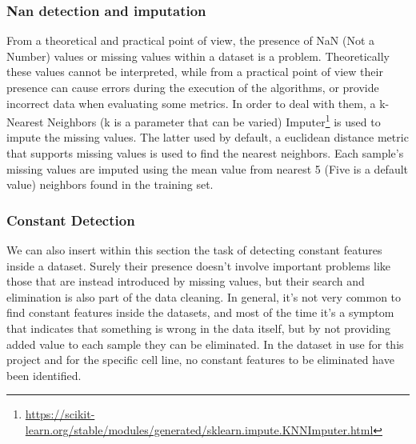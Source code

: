 \documentclass{article}
\begin{document}
\subsubsection{Nan detection and imputation}
\label{subsec:Nan_detection_and_imputation}
From a theoretical and practical point of view, the presence of NaN (Not a Number) values or missing values within a dataset is a problem. Theoretically these values cannot be interpreted, while from a practical point of view their presence can cause errors during the execution of the algorithms, or provide incorrect data when evaluating some metrics. In order to deal with them, a k-Nearest Neighbors (k is a parameter that can be varied) Imputer\footnote{\url{https://scikit-learn.org/stable/modules/generated/sklearn.impute.KNNImputer.html}} is used to impute the missing values. The latter used by default, a euclidean distance metric that supports missing values is used to find the nearest neighbors. Each sample’s missing values are imputed using the mean value from nearest 5 (Five is a default value) neighbors found in the training set.

\subsubsection{Constant Detection}
\label{subsec:Constant_Detection}
We can also insert within this section the task of detecting constant features inside a dataset. Surely their presence doesn't involve important problems like those that are instead introduced by missing values, but their search and elimination is also part of the data cleaning. In general, it's not very common to find constant features inside the datasets, and most of the time it's a symptom that indicates that something is wrong in the data itself, but by not providing added value to each sample they can be eliminated. In the dataset in use for this project and for the specific cell line, no constant features to be eliminated have been identified.
\end{document}
